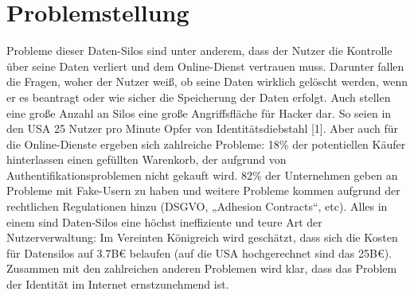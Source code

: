 \chapter{Problemstellung}
\label{cha:grundlagen}

Probleme dieser Daten-Silos sind unter anderem, dass der Nutzer die Kontrolle über seine Daten verliert und dem Online-Dienst vertrauen muss. Darunter fallen die Fragen, woher der Nutzer weiß, ob seine Daten wirklich gelöscht werden, wenn er es beantragt oder wie sicher die Speicherung der Daten erfolgt. Auch stellen eine große Anzahl an Silos eine große Angriffsfläche für Hacker dar. So seien in den USA 25 Nutzer pro Minute Opfer von Identitätsdiebstahl [1]. Aber auch für die Online-Dienste ergeben sich zahlreiche Probleme: 18\% der potentiellen Käufer hinterlassen einen gefüllten Warenkorb, der aufgrund von Authentifikationsproblemen nicht gekauft wird. 82\% der Unternehmen geben an Probleme mit Fake-Usern zu haben und weitere Probleme kommen aufgrund der rechtlichen Regulationen hinzu (DSGVO, „Adhesion Contracts“, etc). Alles in einem sind Daten-Silos eine höchst ineffiziente und teure Art der Nutzerverwaltung: Im Vereinten Königreich wird geschätzt, dass sich die Kosten für Datensilos auf 3.7B€ belaufen (auf die USA hochgerechnet sind das 25B€). Zusammen mit den zahlreichen anderen Problemen wird klar, dass das Problem der Identität im Internet ernstzunehmend ist.